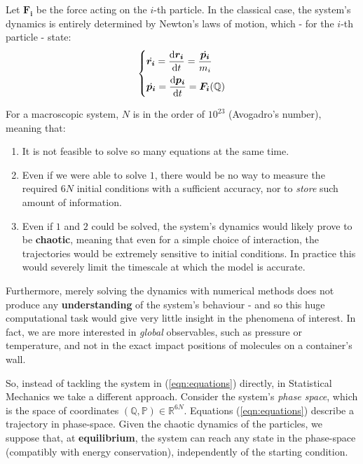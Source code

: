 \documentclass[../template.tex]{subfiles}
\begin{document}
Let $\bm{F_i}$ be the force acting on the $i$-th particle. In the classical case, the system's dynamics is entirely determined by Newton's laws of motion, which - for the $i$-th particle - state:
\begin{align}\label{eqn:equations}
    \begin{dcases}
        \dot{\bm{r_i}} = \dv{\bm{r_i}}{t} = \frac{\dot{\bm{p_i}}}{m_i}\\ 
        \dot{\bm{p_i}} = \dv{\bm{p_i}}{t} = \bm{F_i}(\mathbb{Q})
    \end{dcases}
\end{align}

For a macroscopic system, $N$ is in the order of $10^{23}$ (Avogadro's number), meaning that:
\begin{enumerate}
    \item It is not feasible to solve so many equations at the same time. 
    \item Even if we were able to solve $1$, there would be no way to measure the required $6N$ initial conditions with a sufficient accuracy, nor to \textit{store} such amount of information.
    \item Even if $1$ and $2$ could be solved, the system's dynamics would likely
prove to be \textbf{chaotic}, meaning that even for a simple choice of interaction, the trajectories would be extremely sensitive to initial conditions. In practice this would severely limit the timescale at which the model is accurate.
\end{enumerate}
Furthermore, merely solving the dynamics with numerical methods does not produce any \textbf{understanding} of the system's behaviour - and so this huge computational task would give very little insight in the phenomena of interest.
In fact, we are more interested in \textit{global} observables, such as pressure or temperature, and not in the exact impact positions of molecules on a container's wall.

\medskip

So, instead of tackling the system in (\ref{eqn:equations}) directly, in Statistical Mechanics we take a different approach. Consider the system's \textit{phase space}, which is the space of coordinates $(\mathbb{Q},\mathbb{P}) \in \mathbb{R}^{6N}$. Equations (\ref{eqn:equations}) describe a trajectory in phase-space. Given the chaotic dynamics of the particles, we suppose that, at \textbf{equilibrium}, the system can reach any state in the phase-space (compatibly with energy conservation), independently of the starting condition.
\end{document}
